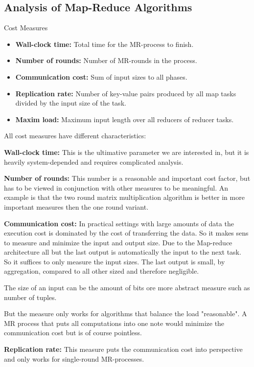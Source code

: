 \documentclass{panikzettel}
\begin{document}
\subsection{Analysis of Map-Reduce Algorithms}
\begin{defi}{Cost Measures}
\begin{itemize}
	\item \textbf{Wall-clock time:} Total time for the MR-process to finish.
	\item \textbf{Number of rounds:} Number of MR-rounds in the process.
	\item \textbf{Communication cost:} Sum of input sizes to all phases.
	\item \textbf{Replication rate:} Number of key-value pairs produced by all map tasks divided by the input size of the task.
	\item \textbf{Maxim load:} Maximum input length over all reducers of reducer tasks.
\end{itemize}
\end{defi}

All cost measures have different characteristics:

\textbf{Wall-clock time:} This is the ultimative parameter we are interested in, but it is heavily system-depended and requires complicated analysis.

\textbf{Number of rounds:} This number is a reasonable and important cost factor, but has to be viewed in conjunction with other measures to be meaningful. An example is that the two round matrix multiplication algorithm is better in more important measures then the one round variant.

\textbf{Communication cost:} In practical settings with large amounts of data the execution cost is dominated by the cost of transferring the data. So it makes sens to measure and minimize the input and output size.
Due to the Map-reduce architecture all but the last output is automatically the input to the next task. So it suffices to only measure the input sizes. The last output is small, by aggregation, compared to all other sized and therefore negligible.

The size of an input can be the amount of bits ore more abstract measure such as number of tuples.

But the measure only works for algorithms that balance the load "reasonable". A MR process that puts all computations into one note would minimize the communication cost but is of course pointless.

\textbf{Replication rate:} This measure puts the communication cost into perspective and only works for single-round MR-processes.
\end{document}
